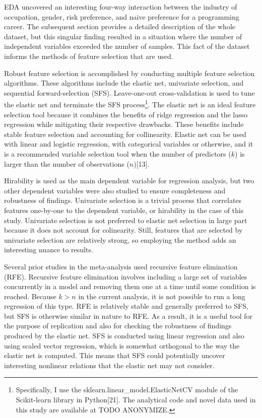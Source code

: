 \documentclass[review]{elsarticle}
\begin{document}
EDA uncovered an interesting four-way interaction between
the industry of occupation, gender, risk preference, and naive preference for a programming career.
The subsequent section provides a detailed description of the whole dataset,
but this singular finding resulted in a situation where the number of independent variables exceeded the number of samples.
This fact of the dataset informs the methods of feature selection that are used.

Robust feature selection is accomplished by conducting multiple feature selection algorithms.
These algorithms include the elastic net, univariate selection, and sequential forward-selection (SFS).
Leave-one-out cross-validation is used to tune the elastic net and terminate the SFS process\footnote{
    Specifically, I use the sklearn.linear_model.ElasticNetCV module of the Scikit-learn library in Python[21].
    The analytical code and novel data used in this study are available at TODO ANONYMIZE.
}.
The elastic net is an ideal feature selection tool because it combines the benefits of ridge regression and the lasso regression
while mitigating their respective drawbacks.
These benefits include stable feature selection and accounting for collinearity.
Elastic net can be used with linear and logistic regression, with categorical variables or otherwise,
and it is a recommended variable selection tool
when the number of predictors ($k$) is larger than the number of observations ($n$)[13].

Hirability is used as the main dependent variable for regression analysis,
but two other dependent variables were also studied to ensure completeness and robustness of findings.
Univariate selection is a trivial process that correlates features one-by-one to the dependent variable,
or hirability in the case of this study.
Univariate selection is not preferred to elastic net selection in large part because it does not account for colinearity.
Still, features that are selected by univariate selection are relatively strong, so employing the method adds an interesting nuance to results.

Several prior studies in the meta-analysis used recursive feature elimination (RFE).
Recursive feature elimination involves including a large set of variables concurrently in a model and removing them one at a time
until some condition is reached.
Because $k > n$ in the current analysis, it is not possible to run a long regression of this type.
RFE is relatively stable and generally preferred to SFS, but SFS is otherwise similar in nature to RFE.
As a result, it is a useful tool for the purpose of replication and also for checking the robustness of findings produced by the elastic net.
SFS is conducted using linear regression and also using scaled vector regression, which is somewhat orthogonal to the way the elastic net is computed.
This means that SFS could potentially uncover interesting nonlinear relations that the elastic net may not consider.
\end{document}
